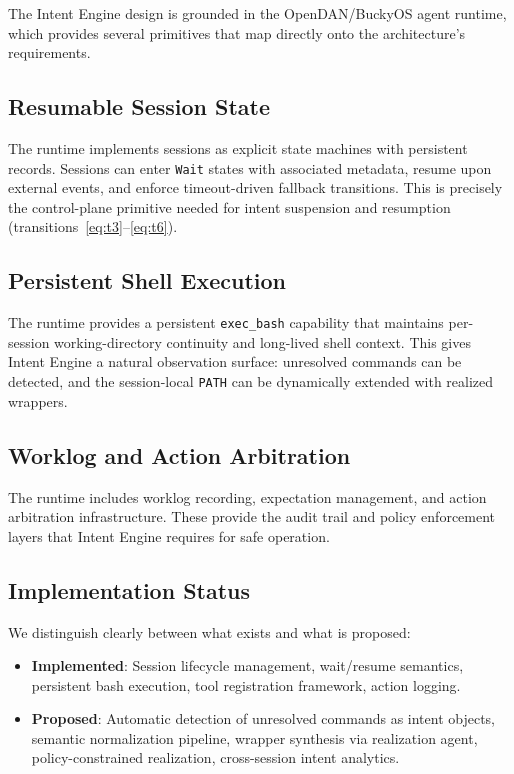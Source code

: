 \documentclass[11pt]{article}
\begin{document}
The Intent Engine design is grounded in the OpenDAN/BuckyOS agent runtime, which provides several primitives that map directly onto the architecture's requirements.

\subsection{Resumable Session State}

The runtime implements sessions as explicit state machines with persistent records.
Sessions can enter \texttt{Wait} states with associated metadata, resume upon external events, and enforce timeout-driven fallback transitions.
This is precisely the control-plane primitive needed for intent suspension and resumption (transitions~\eqref{eq:t3}--\eqref{eq:t6}).

\subsection{Persistent Shell Execution}

The runtime provides a persistent \texttt{exec\_bash} capability that maintains per-session working-directory continuity and long-lived shell context.
This gives Intent Engine a natural observation surface: unresolved commands can be detected, and the session-local \texttt{PATH} can be dynamically extended with realized wrappers.

\subsection{Worklog and Action Arbitration}

The runtime includes worklog recording, expectation management, and action arbitration infrastructure.
These provide the audit trail and policy enforcement layers that Intent Engine requires for safe operation.

\subsection{Implementation Status}

We distinguish clearly between what exists and what is proposed:

\begin{itemize}[leftmargin=*]
  \item \textbf{Implemented}: Session lifecycle management, wait/resume semantics, persistent bash execution, tool registration framework, action logging.
  \item \textbf{Proposed}: Automatic detection of unresolved commands as intent objects, semantic normalization pipeline, wrapper synthesis via realization agent, policy-constrained realization, cross-session intent analytics.
\end{itemize}
\end{document}
